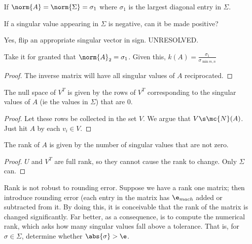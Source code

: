 \documentclass[../main.tex]{subfiles}
\begin{document}
\begin{theorem}
    If $\norm{A} = \norm{\Sigma} = \sigma_1$ where $\sigma_1$ is the largest diagonal entry in $\Sigma$.
\end{theorem}

\begin{remark}
    If a singular value appearing in $\Sigma$ is negative, can it be made positive?
\end{remark}
\begin{solution}
    Yes, flip an appropriate singular vector in sign. UNRESOLVED.
\end{solution}

\begin{proposition}
    Take it for granted that $\norm{A}_2 = \sigma_1$. Given this, $k(A) = \frac{\sigma_1}{\sigma_{\min{m,n}}}$
\end{proposition}

\begin{proof}
    The inverse matrix will have all singular values of $A$ reciprocated.
\end{proof}

\begin{proposition}
   The null space of $V^T$ is given by the rows of $V^T$ corresponding to the singular values of $A$ (ie the values in $\Sigma$) that are $0$.
\end{proposition}
\begin{proof}
    Let these rows be collected in the set $V$. We argue
    that $V \s \mc{N}(A)$. Just hit $A$ by each $v_i \in V$.
\end{proof}

\begin{proposition}
    The rank of $A$ is given by the number of singular values
    that are not zero.
\end{proposition}
\begin{proof}
    $U$ and $V^T$ are full rank, so they cannot cause the rank to change. Only $\Sigma$ can.
\end{proof}

\begin{remark}
    Rank is not robust to rounding error. Suppose we have a rank one matrix; then introduce rounding error (each entry in the matrix has $\e_{mach}$ added or subtracted from it. By doing this, it is conceivable that the rank of the matrix is changed significantly. Far better, as a consequence, is to compute the numerical rank, which asks how many singular values fall above a tolerance. That is, for $\sigma \in \Sigma$, determine whether $\abs{\sigma} > \e$.
\end{remark}
\end{document}
